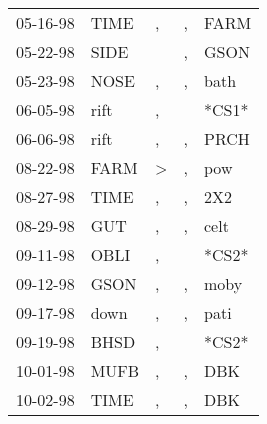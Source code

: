 \begin{supertabular}{p{0.07\textwidth}p{0.06\textwidth}p{0.02\textwidth}p{0.02\textwidth}p{0.06\textwidth}}
          05-16-98\textsuperscript{} &           TIME\textsuperscript{} &                , &                , &           FARM\textsuperscript{} \\
          05-22-98\textsuperscript{} &           SIDE\textsuperscript{} &                  &                , &           GSON\textsuperscript{} \\
          05-23-98\textsuperscript{} &           NOSE\textsuperscript{} &                , &                , &           bath\textsuperscript{} \\
          06-05-98\textsuperscript{} &           rift\textsuperscript{} &                , &                  &                            *CS1* \\
          06-06-98\textsuperscript{} &           rift\textsuperscript{} &                , &                , &           PRCH\textsuperscript{} \\
          08-22-98\textsuperscript{} &           FARM\textsuperscript{} &     \textgreater &                , &            pow\textsuperscript{} \\
          08-27-98\textsuperscript{} &           TIME\textsuperscript{} &                , &                , &            2X2\textsuperscript{} \\
          08-29-98\textsuperscript{} &            GUT\textsuperscript{} &                , &                , &           celt\textsuperscript{} \\
          09-11-98\textsuperscript{} &           OBLI\textsuperscript{} &                , &                  &                            *CS2* \\
          09-12-98\textsuperscript{} &           GSON\textsuperscript{} &                , &                , &           moby\textsuperscript{} \\
          09-17-98\textsuperscript{} &           down\textsuperscript{} &                , &                , &           pati\textsuperscript{} \\
          09-19-98\textsuperscript{} &           BHSD\textsuperscript{} &                , &                  &                            *CS2* \\
          10-01-98\textsuperscript{} &           MUFB\textsuperscript{} &                , &                , &            DBK\textsuperscript{} \\
          10-02-98\textsuperscript{} &           TIME\textsuperscript{} &                , &                , &            DBK\textsuperscript{} \\

\end{supertabular}
